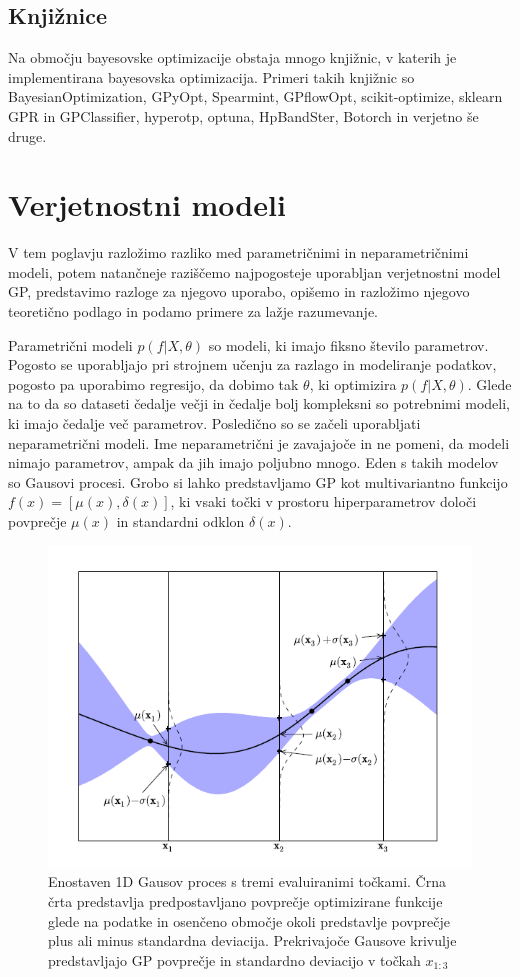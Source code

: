\documentclass[a4paper, 12pt]{book}
\begin{document}
\section{Knjižnice}

\par Na območju bayesovske optimizacije obstaja mnogo knjižnic, v katerih je implementirana bayesovska optimizacija.
Primeri takih knjižnic so BayesianOptimization, GPyOpt, Spearmint, GPflowOpt, scikit-optimize, sklearn GPR in GPClassifier, hyperotp, optuna, HpBandSter, Botorch in verjetno še druge.

\chapter{Verjetnostni modeli}

\par V tem poglavju razložimo razliko med parametričnimi in neparametričnimi modeli, potem natančneje raziščemo najpogosteje uporabljan verjetnostni model GP, predstavimo razloge za njegovo uporabo, opišemo in razložimo njegovo teoretično podlago in podamo primere za lažje razumevanje.
\par Parametrični modeli $p(f|X,\theta)$ so modeli, ki imajo fiksno število parametrov.
Pogosto se uporabljajo pri strojnem učenju za razlago in modeliranje podatkov, pogosto pa uporabimo regresijo, da dobimo tak $\theta$, ki optimizira $p(f|X,\theta)$.
Glede na to da so dataseti čedalje večji in čedalje bolj kompleksni so potrebnimi modeli, ki imajo čedalje več parametrov.
Posledično so se začeli uporabljati neparametrični modeli.
Ime neparametrični je zavajajoče in ne pomeni, da modeli nimajo parametrov, ampak da jih imajo poljubno mnogo.
Eden s takih modelov so Gausovi procesi.
Grobo si lahko predstavljamo GP kot multivariantno funkcijo $f(x) = [\mu(x), \delta(x)]$, ki vsaki točki v prostoru hiperparametrov določi povprečje $\mu(x)$ in standardni odklon $\delta(x)$.

\begin{figure}[H]
\centerline{\includegraphics[height=0.5\textwidth]{images/gausian_simple_example}}
\caption{Enostaven 1D Gausov proces s tremi evaluiranimi točkami.
Črna črta predstavlja predpostavljano povprečje optimizirane funkcije glede na podatke in osenčeno območje okoli predstavlje povprečje plus ali minus standardna deviacija.
Prekrivajoče Gausove krivulje predstavljajo GP povprečje in standardno deviacijo v točkah $x_{1:3}$}
\label{1D Gausov proces}
\end{figure}
\end{document}
